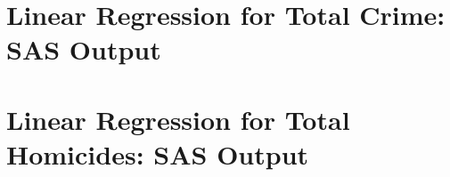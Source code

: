 \documentclass[12pt]{article}
\begin{document}
\newpage

\begin{appendices}

\section{Linear Regression for Total Crime:  SAS Output}
	


\section{Linear Regression for Total Homicides:  SAS Output}


	

\end{appendices}
\end{document}
